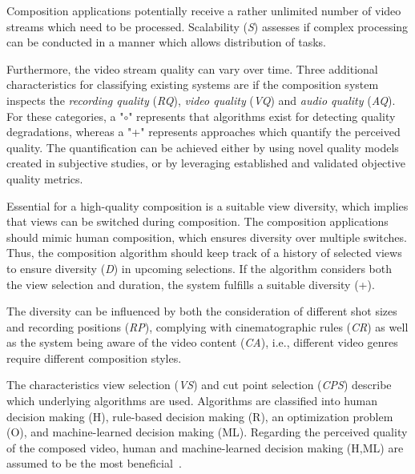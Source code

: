 Composition applications potentially receive a rather unlimited number of video streams which need to be processed.
Scalability (\emph{S}) assesses if complex processing can be conducted in a manner which allows distribution of tasks.

Furthermore, the video stream quality can vary over time. 
Three additional characteristics for classifying existing systems are if the composition system inspects the \emph{recording quality} (\emph{RQ}), \emph{video quality} (\emph{VQ}) and \emph{audio quality} (\emph{AQ}).
For these categories, a "$\circ$" represents that algorithms exist for detecting quality degradations, whereas a "+" represents approaches which quantify the perceived quality.
The quantification can be achieved either by using novel quality models created in subjective studies, or by leveraging established and validated objective quality metrics.

Essential for a high-quality composition is a suitable view diversity, which implies that views can be switched during composition.
The composition applications should mimic human composition, which ensures diversity over multiple switches. 
Thus, the composition algorithm should keep track of a history of selected views to ensure diversity (\emph{D}) in upcoming selections. 
If the algorithm considers both the view selection and duration, the system fulfills a suitable diversity (+).

The diversity can be influenced by both the consideration of different shot sizes and recording positions (\emph{RP}), complying with cinematographic rules (\emph{CR}) as well as the system being aware of the video content (\emph{CA}), i.e., different video genres require different composition styles.
  
The characteristics view selection (\emph{VS}) and cut point selection (\emph{CPS}) describe which underlying algorithms are used.
Algorithms are classified into human decision making (H), rule-based decision making (R), an optimization problem (O), and machine-learned decision making (ML).
Regarding the perceived quality of the composed video, human and machine-learned decision making (H,ML) are assumed to be the most beneficial~\cite{Saini2012}.

